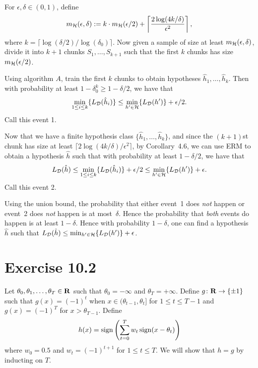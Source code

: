 For $\epsilon, \delta \in (0, 1)$, define 
\[
m_{\mathcal{H}}(\epsilon, \delta) := k \cdot m_{\mathcal{H}}(\epsilon / 2) + 
\left \lceil \frac{2 \log (4 k /  \delta)}{\epsilon^2}\right \rceil,
\]
where $k = \lceil \log (\delta / 2) / \log (\delta_0) \rceil$. Now
given a sample of size at least $m_{\mathcal{H}}(\epsilon, \delta)$, divide
it into $k + 1$ chunks $S_1, \ldots, S_{k + 1}$ such that the first $k$
chunks has size $m_{\mathcal{H}}(\epsilon / 2)$. 

Using algorithm $A$, train the first $k$ chunks to obtain hypotheses
$\hat{h}_1, \ldots, \hat{h}_k$. Then with probability at least 
$1 - \delta_0^k \geq 1 - \delta / 2$, we have that 
\[
    \min_{1 \leq i \leq k} \{L_{\mathcal{D}} (\hat{h}_i)\} 
        \leq \min_{h' \in \mathcal{H}} \{ L_{\mathcal{D}}(h') \} + \epsilon / 2.
\]
Call this event 1.

Now that we have a finite hypothesis class $\{ \hat{h}_1, \ldots, \hat{h}_k \}$,
and since the $(k + 1)$st chunk has size at least 
$\lceil 2 \log (4 k / \delta) /  \epsilon^2 \rceil$, by Corollary~4.6,
we can use ERM to obtain a hypothesis $\hat{h}$ such that 
with probability at least $1 - \delta / 2$, we have that 
\[
    L_{\mathcal{D}}(\hat{h}) \leq \min_{1 \leq i \leq k} \{L_{\mathcal{D}} (\hat{h}_i)\} + 
        \epsilon / 2
         \leq \min_{h' \in \mathcal{H}} \{ L_{\mathcal{D}}(h') \} + \epsilon.
\]
Call this event 2.

Using the union bound, the probability that either event~1 does \emph{not} 
happen or event~2 does \emph{not} happen is at most~$\delta$. Hence the 
probability that \emph{both} events do happen is at least $1 - \delta$. 
Hence with probability $1 - \delta$, one can find a hypothesis $\hat{h}$ 
such that $L_{\mathcal{D}}(\hat{h}) \leq 
\min_{h' \in \mathcal{H}} \{ L_{\mathcal{D}}(h') \} + \epsilon$.

\section*{Exercise 10.2}

Let $\theta_0, \theta_1, \ldots, \theta_{T} \in \mathbf{R}$ such that 
$\theta_0 = -\infty$ and $\theta_{T} = + \infty$. Define 
$g \colon \mathbf{R} \rightarrow \{\pm 1\}$ such that $g(x) = (-1)^t$ 
when $x \in (\theta_{t - 1}, \theta_t]$ for $1 \leq t \leq T - 1$ 
and $g(x) = (-1)^{T}$ for $x > \theta_{T - 1}$. Define
\[
    h(x) =  \operatorname{sign} \left ( \sum_{t = 0}^T w_t \operatorname{sign} (x - \theta_{t} )\right )
\]
where $w_0 = 0.5$ and $w_t = (-1)^{t + 1}$ for $1 \leq t \leq T$. We will show 
that $h = g$ by inducting on $T$.

